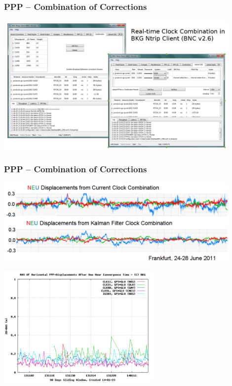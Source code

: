 \documentclass[10pt]{beamer}
\begin{document}

\begin{frame}
\frametitle{PPP -- Combination of Corrections}
  \begin{center}
    \includegraphics[width=0.9\textwidth,angle=0]{combination_1.png}
  \end{center}
\end{frame}


\begin{frame}
\frametitle{PPP -- Combination of Corrections}
  \begin{center}
    \includegraphics[width=0.9\textwidth,angle=0]{combination_2.png}

    \includegraphics[width=0.6\textwidth,angle=0]{dailyRMS_GLONASS.png}
  \end{center}
\end{frame}
\end{document}
